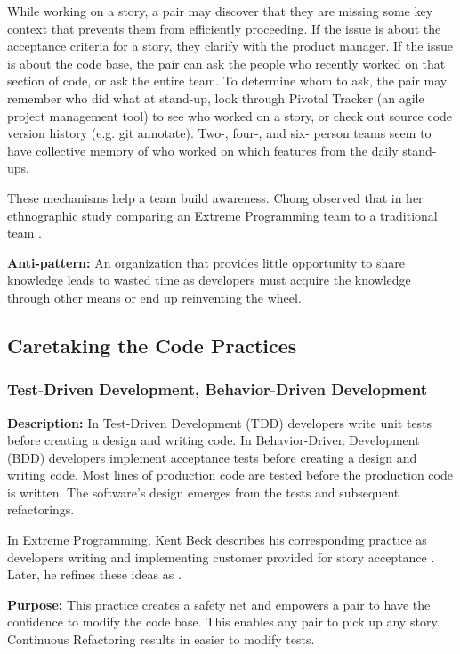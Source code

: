 While working on a story, a pair may discover that they are missing some key context that prevents them from efficiently proceeding. If the issue is about the acceptance criteria for a story, they clarify with the product manager. If the issue is about the code base, the pair can ask the people who recently worked on that section of code, or ask the entire team. To determine whom to ask, the pair may remember who did what at stand-up, look through Pivotal Tracker (an agile project management tool) to see who worked on a story, or check out source code version history (e.g. git annotate). Two-, four-, and six- person teams seem to have collective memory of who worked on which features from the daily stand-ups. 

These mechanisms help a team build awareness. Chong observed that  in her ethnographic study comparing an Extreme Programming team to a traditional team \cite{ChongNominum}.
 
\textbf{Anti-pattern:} An organization that provides little opportunity to share knowledge leads to wasted time as developers must acquire the knowledge through other means or end up reinventing the wheel.
\subsection{Caretaking the Code Practices}
\subsubsection{Test-Driven Development, Behavior-Driven Development}
\textbf{Description:} In Test-Driven Development (TDD) developers write unit tests before creating a design and writing code. In Behavior-Driven Development (BDD) developers implement acceptance tests before creating a design and writing code. Most lines of production code are tested before the production code is written. The software's design emerges from the tests and subsequent refactorings.

In Extreme Programming, Kent Beck describes his corresponding  practice as developers writing  and implementing customer provided  for story acceptance \cite{BeckExtremeProgramming1999}. Later, he refines these ideas as  \cite{BeckExtremeProgramming2004}. 

\textbf{Purpose:} This practice creates a safety net and empowers a pair to have the confidence to modify the code base. This enables any pair to pick up any story. Continuous Refactoring results in easier to modify tests.

